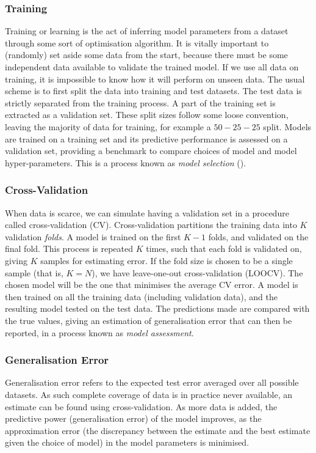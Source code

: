 \documentclass[11pt]{amsart}
\begin{document}
\subsubsection{Training} Training or learning is the act of inferring model parameters from a dataset through some sort of optimisation algorithm. It is vitally important to (randomly) set aside some data from the start, because there must be some independent data available to validate the trained model. If we use all data on training, it is impossible to know how it will perform on unseen data. The usual scheme is to first split the data into training and test datasets. The test data is strictly separated from the training process. A part of the training set is extracted as a validation set. These split sizes follow some loose convention, leaving the majority of data for training, for example a $50-25-25$ split. Models are trained on a training set and its predictive performance is assessed on a validation set, providing a benchmark to compare choices of model and model hyper-parameters. This is a process known as \emph{model selection} (\cite{htf}).

\subsubsection{Cross-Validation}
When data is scarce, we can simulate having a validation set in a procedure called cross-validation (CV). Cross-validation partitions the training data into $K$ validation \emph{folds}. A model is trained on the first $K - 1$ folds, and validated on the final fold. This process is repeated $K$ times, such that each fold is validated on, giving $K$ samples for estimating error. If the fold size is chosen to be a single sample (that is, $K = N$), we have leave-one-out cross-validation (LOOCV). The chosen model will be the one that minimises the average CV error. A model is then trained on all the training data (including validation data), and the resulting model tested on the test data. The predictions made are compared with the true values, giving an estimation of generalisation error that can then be reported, in a process known as \emph{model assessment}.

\subsubsection{Generalisation Error}
Generalisation error refers to the expected test error averaged over all possible datasets. As such complete coverage of data is in practice never available, an estimate can be found using cross-validation. As more data is added, the predictive power (generalisation error) of the model improves, as the approximation error (the discrepancy between the estimate and the best estimate given the choice of model) in the model parameters is minimised.
\end{document}
